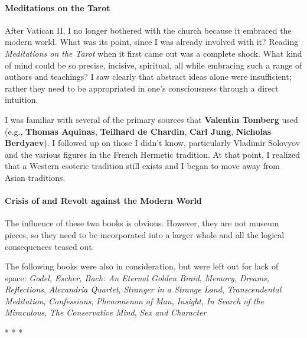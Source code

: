\paragraph{Meditations on the Tarot}
After Vatican II, I no longer bothered with the church because it embraced the modern world. What was its point, since I was already involved with it? Reading \emph{Meditations on the Tarot} when it first came out was a complete shock. What kind of mind could be so precise, incisive, spiritual, all while embracing such a range of authors and teachings? I saw clearly that abstract ideas alone were insufficient; rather they need to be appropriated in one's consciousness through a direct intuition.

I was familiar with several of the primary sources that \textbf{Valentin Tomberg} used (e.g., \textbf{Thomas Aquinas}, \textbf{Teilhard de Chardin}, \textbf{Carl Jung}, \textbf{Nicholas Berdyaev}). I followed up on those I didn't know, particularly Vladimir Solovyov and the various figures in the French Hermetic tradition. At that point, I realized that a Western esoteric tradition still exists and I began to move away from Asian traditions.

\paragraph{Crisis of and Revolt against the Modern World}
The influence of these two books is obvious. However, they are not museum pieces, so they need to be incorporated into a larger whole and all the logical consequences teased out.

The following books were also in consideration, but were left out for lack of space: \emph{Godel, Escher, Bach: An Eternal Golden Braid}, \emph{Memory, Dreams, Reflections}, \emph{Alexandria Quartet}, \emph{Stranger in a Strange Land}, \emph{Transcendental Meditation}, \emph{Confessions}, \emph{Phenomenon of Man}, \emph{Insight}, \emph{In Search of the Miraculous}, \emph{The Conservative Mind}, \emph{Sex and Character}




\begin{center}* * *\end{center}

